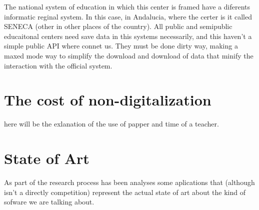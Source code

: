 \documentclass[oneside,english,titlepage]{scrbook}
\begin{document}
\bigskip
{}
\bigskip

The national system of education in which this center is framed have a diferents informatic reginal system. In this case, in Andalucia, where the certer is it called SENECA (other in other places of the country). All public and semipublic educaitonal centers need save data in this systems necessarily, and this haven't a simple public API where connet us. They must be done dirty way, making a maxed mode way to simplify the download and download of data that minify the interaction with the official system.


\section{The cost of non-digitalization}

here will be the exlanation of the use of papper and time of a teacher.

\section{State of Art }

As part of the research process has been analyses some aplications
that (although isn't a directly competition) represent the actual
state of art about the kind of sofware we are talking about.
\end{document}
